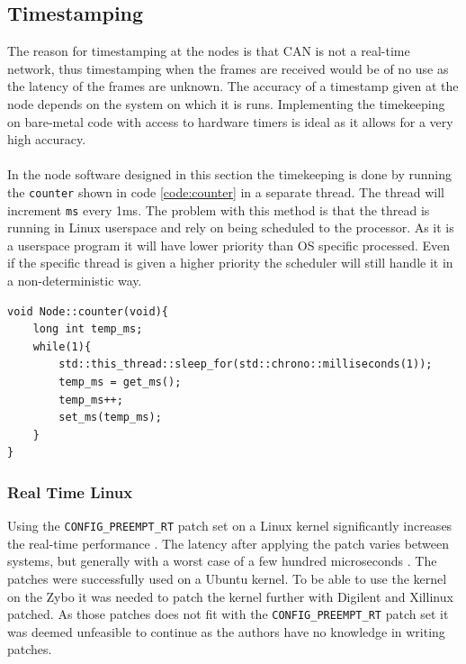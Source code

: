 
\subsection{Timestamping}\label{sec:time}
The reason for timestamping at the nodes is that CAN is not a real-time network, thus timestamping when the frames are received would be of no use as the latency of the frames are unknown.
The accuracy of a timestamp given at the node depends on the system on which it is runs. 
Implementing the timekeeping on bare-metal code with access to hardware timers is ideal as it allows for a very high accuracy.
\\~\\
In the node software designed in this section the timekeeping is done by running the \texttt{counter} shown in code \ref{code:counter} in a separate thread.
The thread will increment \texttt{ms} every 1ms.
The problem with this method is that the thread is running in Linux userspace and rely on being scheduled to the processor. 
As it is a userspace program it will have lower priority than OS specific processed.
Even if the specific thread is given a higher priority the scheduler will still handle it in a non-deterministic way.

\begin{lstlisting}[caption=Declaration of counter function.,label=code:counter]
void Node::counter(void){
	long int temp_ms;
	while(1){
		std::this_thread::sleep_for(std::chrono::milliseconds(1));
		temp_ms = get_ms();
		temp_ms++;
		set_ms(temp_ms);
	}
}
\end{lstlisting}

\subsubsection*{Real Time Linux}
Using the \texttt{CONFIG\_PREEMPT\_RT} patch set on a Linux kernel significantly increases the real-time performance \cite{real_time_linux}.
The latency after applying the patch varies between systems, but generally with a worst case of a few hundred microseconds \cite{real_time_linux1}.
The patches were successfully used on a Ubuntu kernel.
To be able to use the kernel on the Zybo it was needed to patch the kernel further with Digilent and Xillinux patched.
As those patches does not fit with the \texttt{CONFIG\_PREEMPT\_RT} patch set it was deemed unfeasible to continue as the authors have no knowledge in writing patches. 